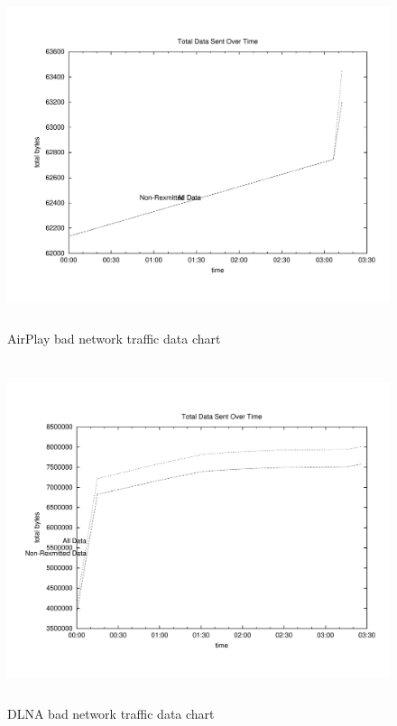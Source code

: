 \begin{figure}[htb]
\centering \includegraphics[height=10cm]{charts/airplay_traffic_5loss_data}
\caption{AirPlay bad network traffic data chart \label{chart6}}
\end{figure}
\begin{figure}[htb]
\centering \includegraphics[height=10cm]{charts/dlna_traffic_5loss_data}
\caption{DLNA bad network traffic data chart \label{chart6}}
\end{figure}


